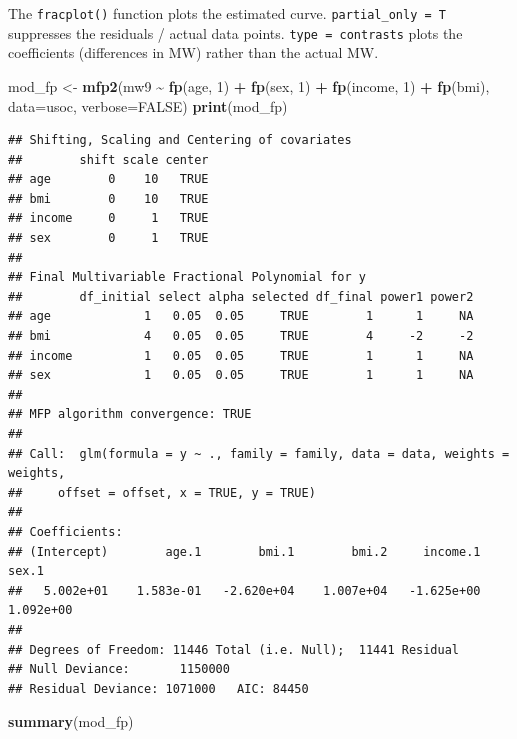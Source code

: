 \documentclass[
]{book}
\newenvironment{Shaded}{\begin{snugshade}}{\end{snugshade}}
\newcommand{\AttributeTok}[1]{\textcolor[rgb]{0.13,0.29,0.53}{#1}}
\newcommand{\ConstantTok}[1]{\textcolor[rgb]{0.56,0.35,0.01}{#1}}
\newcommand{\DecValTok}[1]{\textcolor[rgb]{0.00,0.00,0.81}{#1}}
\newcommand{\FunctionTok}[1]{\textcolor[rgb]{0.13,0.29,0.53}{\textbf{#1}}}
\newcommand{\NormalTok}[1]{#1}
\newcommand{\OtherTok}[1]{\textcolor[rgb]{0.56,0.35,0.01}{#1}}
\newcommand{\SpecialCharTok}[1]{\textcolor[rgb]{0.81,0.36,0.00}{\textbf{#1}}}
\begin{document}
The \texttt{fracplot()} function plots the estimated curve. \texttt{partial\_only\ =\ T} suppresses the residuals / actual data points. \texttt{type\ =\ \textquotesingle{}contrasts\textquotesingle{}} plots the coefficients (differences in MW) rather than the actual MW.

\begin{Shaded}
\begin{Highlighting}[]
\NormalTok{mod\_fp }\OtherTok{\textless{}{-}} \FunctionTok{mfp2}\NormalTok{(mw9 }\SpecialCharTok{\textasciitilde{}} \FunctionTok{fp}\NormalTok{(age, }\DecValTok{1}\NormalTok{) }\SpecialCharTok{+} \FunctionTok{fp}\NormalTok{(sex, }\DecValTok{1}\NormalTok{) }\SpecialCharTok{+} \FunctionTok{fp}\NormalTok{(income, }\DecValTok{1}\NormalTok{) }\SpecialCharTok{+} \FunctionTok{fp}\NormalTok{(bmi), }\AttributeTok{data=}\NormalTok{usoc, }\AttributeTok{verbose=}\ConstantTok{FALSE}\NormalTok{)}
\FunctionTok{print}\NormalTok{(mod\_fp)}
\end{Highlighting}
\end{Shaded}

\begin{verbatim}
## Shifting, Scaling and Centering of covariates 
##        shift scale center
## age        0    10   TRUE
## bmi        0    10   TRUE
## income     0     1   TRUE
## sex        0     1   TRUE
## 
## Final Multivariable Fractional Polynomial for y 
##        df_initial select alpha selected df_final power1 power2
## age             1   0.05  0.05     TRUE        1      1     NA
## bmi             4   0.05  0.05     TRUE        4     -2     -2
## income          1   0.05  0.05     TRUE        1      1     NA
## sex             1   0.05  0.05     TRUE        1      1     NA
## 
## MFP algorithm convergence: TRUE
## 
## Call:  glm(formula = y ~ ., family = family, data = data, weights = weights, 
##     offset = offset, x = TRUE, y = TRUE)
## 
## Coefficients:
## (Intercept)        age.1        bmi.1        bmi.2     income.1        sex.1  
##   5.002e+01    1.583e-01   -2.620e+04    1.007e+04   -1.625e+00    1.092e+00  
## 
## Degrees of Freedom: 11446 Total (i.e. Null);  11441 Residual
## Null Deviance:       1150000 
## Residual Deviance: 1071000   AIC: 84450
\end{verbatim}

\begin{Shaded}
\begin{Highlighting}[]
\FunctionTok{summary}\NormalTok{(mod\_fp)}
\end{Highlighting}
\end{Shaded}
\end{document}

